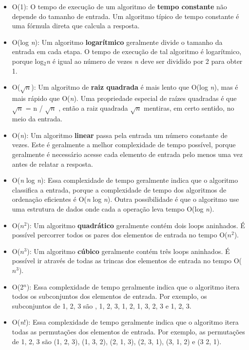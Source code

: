 \begin{itemize}

    \item O(1): O tempo de execução de um algoritmo de \textbf{tempo constante} não depende do tamanho de entrada. Um algoritmo típico de tempo constante é uma fórmula direta que calcula a resposta.

    \item O(log \textit{n}): Um algoritmo \textbf{logarítmico} geralmente divide o tamanho da entrada em cada etapa. O tempo de execução de tal algoritmo é logarítmico, porque log$_2$\textit{n} é igual ao número de vezes \textit{n} deve ser dividido por 2 para obter 1.

    \item O($\sqrt{\textit{n}}$): Um algoritmo de \textbf{raiz quadrada} é mais lento que O(log \textit{n}), mas é mais rápido que O(\textit{n}). Uma propriedade especial de raízes quadradas é que $\sqrt{\textit{n}}$ = n / $\sqrt{\textit{n}}$ , então a raiz quadrada $\sqrt{\textit{n}}$ mentiras, em certo sentido, no meio da entrada.

    \item O(\textit{n}): Um algoritmo \textbf{linear} passa pela entrada um número constante de vezes. Este é geralmente a melhor complexidade de tempo possível, porque geralmente é necessário acesse cada elemento de entrada pelo menos uma vez antes de relatar a resposta.

    \item O(\textit{n} log \textit{n}): Essa complexidade de tempo geralmente indica que o algoritmo classifica a entrada, porque a complexidade de tempo dos algoritmos de ordenação eficientes é O(\textit{n} log \textit{n}). Outra possibilidade é que o algoritmo use uma estrutura de dados onde cada a operação leva tempo O(log \textit{n}).

    \item O($n^2$): Um algoritmo \textbf{quadrático} geralmente contém dois loops aninhados. É possível percorrer todos os pares dos elementos de entrada no tempo O($n^2$).

    \item O($n^3$): Um algoritmo \textbf{cúbico} geralmente contém três loops aninhados. É possível ir através de todas as trincas dos elementos de entrada no tempo O($n^3$).

    \item O(2$^n$): Essa complexidade de tempo geralmente indica que o algoritmo itera todos os subconjuntos dos elementos de entrada. Por exemplo, os subconjuntos de {1, 2, 3} são , {1}, {2}, {3}, {1, 2}, {1, 3}, {2, 3} e {1, 2, 3}.

    \item O(\textit{n}!): Essa complexidade de tempo geralmente indica que o algoritmo itera todas as permutações dos elementos de entrada. Por exemplo, as permutações de {1, 2, 3} são (1, 2, 3), (1, 3, 2), (2, 1, 3), (2, 3, 1), (3, 1, 2) e (3 2, 1).

\end{itemize}

